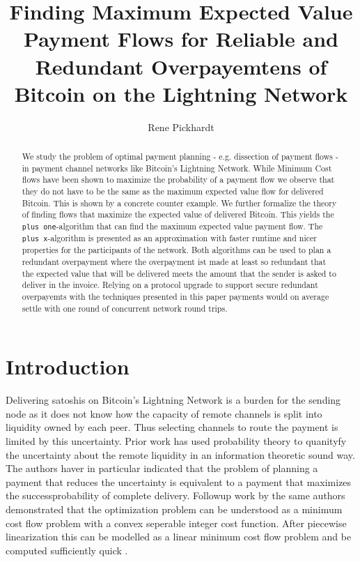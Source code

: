 \documentclass[10pt,twocolumn]{article}
\title{Finding Maximum Expected Value Payment Flows for Reliable and Redundant Overpayemtens of Bitcoin on the Lightning Network}
\author{Rene Pickhardt}
\begin{document}
 
\maketitle

\begin{abstract}
We study the problem of optimal payment planning - e.g. dissection of payment flows - in payment channel networks like Bitcoin's Lightning Network.
While Minimum Cost flows have been shown to maximize the probability of a payment flow we observe that they do not have to be the same as the maximum expected value flow for delivered Bitcoin.
This is shown by a concrete counter example.
We further formalize the theory of finding flows that maximize the expected value of delivered Bitcoin.
This yields the \texttt{plus one}-algorithm that can find the maximum expected value payment flow.
The \texttt{plus x}-algorithm is presented as an approximation with faster runtime and nicer properties for the participants of the network.
Both algorithms can be used to plan a redundant overpayment where the overpayment ist made at least so redundant that the expected value that will be delivered meets the amount that the sender is asked to deliver in the invoice.
Relying on a protocol upgrade to support secure redundant overpayemts with the techniques presented in this paper payments would on average settle with one round of concurrent network round trips.
\end{abstract}

\section{Introduction}
Delivering satoshis on Bitcoin's Lightning Network is a burden for the sending node as it does not know how the capacity of remote channels is split into liquidity owned by each peer.
Thus selecting channels to route the payment is limited by this uncertainty.
Prior work \cite{pickhardt2021security} has used probability theory to quanityfy the uncertainty about the remote liquidity in an information theoretic sound way.
The authors haver in particular indicated that the problem of planning a payment that reduces the uncertainty is equivalent to a payment that maximizes the successprobability of complete delivery.
Followup work by the same authors \cite{pickhardt2021optimally} demonstrated that the optimization problem can be understood as a minimum cost flow problem with a convex seperable integer cost function.
After piecewise linearization this can be modelled as a linear minimum cost flow problem and be computed sufficiently quick \cite{pickhardt2022}.
\end{document}
